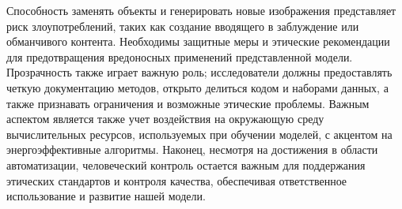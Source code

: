 \documentclass[11pt]{article}
\begin{document}
Способность заменять объекты и генерировать новые изображения представляет риск злоупотреблений, таких как создание вводящего в заблуждение или обманчивого контента. Необходимы защитные меры и этические рекомендации для предотвращения вредоносных применений представленной модели. Прозрачность также играет важную роль; исследователи должны предоставлять четкую документацию методов, открыто делиться кодом и наборами данных, а также признавать ограничения и возможные этические проблемы. Важным аспектом является также учет воздействия на окружающую среду вычислительных ресурсов, используемых при обучении моделей, с акцентом на энергоэффективные алгоритмы. Наконец, несмотря на достижения в области автоматизации, человеческий контроль остается важным для поддержания этических стандартов и контроля качества, обеспечивая ответственное использование и развитие нашей модели.






\end{document}
